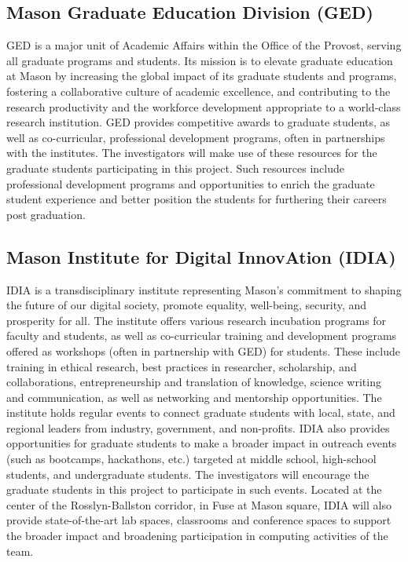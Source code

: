 \documentclass[11pt]{article}
\begin{document}
\subsection*{Mason Graduate Education Division (GED)} GED is a major unit of Academic Affairs within the Office of the Provost, serving all graduate programs and students. Its mission is to elevate graduate education at Mason by increasing the global impact of its graduate students and programs, fostering a collaborative culture of academic excellence, and contributing to the research productivity and the workforce development appropriate to a world-class research institution. GED provides competitive awards to graduate students, as well as co-curricular, professional development programs, often in partnerships with the institutes. The investigators will make use of these resources for the graduate students participating in this project. Such resources include professional development programs and opportunities to enrich the graduate student experience and better position the students for furthering their careers post graduation.

\subsection*{Mason Institute for Digital InnovAtion (IDIA)} IDIA is a transdisciplinary institute representing Mason’s commitment to shaping the future of our digital society, promote equality, well-being, security, and prosperity for all. The institute offers various research incubation programs for faculty and students, as well as co-curricular training and development programs offered as workshops (often in partnership with GED) for students. These include training in ethical research, best practices in researcher, scholarship, and collaborations, entrepreneurship and translation of knowledge, science writing and communication, as well as networking and mentorship opportunities. The institute holds regular events to connect graduate students with local, state, and regional leaders from industry, government, and non-profits. IDIA also provides opportunities for graduate students to make a broader impact in outreach events (such as bootcamps, hackathons, etc.) targeted at middle school, high-school students, and undergraduate students. The investigators will encourage the graduate students in this project to participate in such events. Located at the center of the Rosslyn-Ballston corridor, in Fuse at Mason square, IDIA will also provide state-of-the-art lab spaces, classrooms and conference spaces to support the broader impact and broadening participation in computing activities of the team. 
\end{document}
